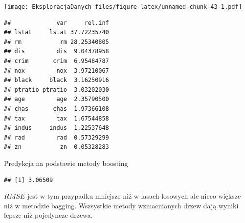 \documentclass[]{book}
\newenvironment{Shaded}{\begin{snugshade}}{\end{snugshade}}
\newcommand{\DataTypeTok}[1]{\textcolor[rgb]{0.13,0.29,0.53}{#1}}
\newcommand{\DecValTok}[1]{\textcolor[rgb]{0.00,0.00,0.81}{#1}}
\newcommand{\KeywordTok}[1]{\textcolor[rgb]{0.13,0.29,0.53}{\textbf{#1}}}
\newcommand{\NormalTok}[1]{#1}
\newcommand{\OperatorTok}[1]{\textcolor[rgb]{0.81,0.36,0.00}{\textbf{#1}}}
\newcommand{\StringTok}[1]{\textcolor[rgb]{0.31,0.60,0.02}{#1}}
\theoremstyle{plain}
\theoremstyle{definition}
\begin{document}
\texttt{[image: EksploracjaDanych\_files/figure-latex/unnamed-chunk-43-1.pdf]}

\begin{verbatim}
##             var     rel.inf
## lstat     lstat 37.72235740
## rm           rm 28.25340805
## dis         dis  9.04378958
## crim       crim  6.95484787
## nox         nox  3.97210067
## black     black  3.16250916
## ptratio ptratio  3.03202030
## age         age  2.35790500
## chas       chas  1.97366108
## tax         tax  1.67544858
## indus     indus  1.22537648
## rad         rad  0.57329299
## zn           zn  0.05328283
\end{verbatim}

Predykcja na podstawie metody boosting

\begin{Shaded}
\end{Shaded}

\begin{verbatim}
## [1] 3.06509
\end{verbatim}

\(RMSE\) jest w tym przypadku mniejsze niż w lasach losowych ale nieco większe niż w metodzie bagging. Wszsystkie metody wzmacnianych drzew dają wyniki lepsze niż pojedyncze drzewa.


\end{document}
